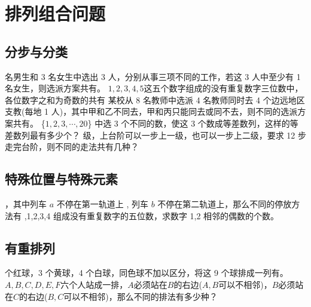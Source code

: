 \documentclass{article}
\begin{document}
\section{排列组合问题}
    \subsection{分步与分类}
         名男生和 3 名女生中选出 3 人，分别从事三项不同的工作，若这 3 人中至少有 1 名女生，则选派方案共有。
        $1,2,3,4,5$这五个数字组成的没有重复数字三位数中，各位数字之和为奇数的共有\lines
        \question[*]某校从 8 名教师中选派 4 名教师同时去 4 个边远地区支教(每地 1 人)，其中甲和乙不同去，甲和丙只能同去或同不去，则不同的选派方案共有。%
        \{$1 , 2 , 3 , \cdots, 20$\} 中选 3 个不同的数，使这 3 个数成等差数列，这样的等差数列最有多少个？
         级，上台阶可以一步上一级，也可以一步上二级，要求 12 步走完台阶，则不同的走法共有几种？
    \subsection{特殊位置与特殊元素}
        ，其中列车 $a$ 不停在第一轨道上 , 列车 $b$ 不停在第二轨道上，那么不同的停放方法有\lines
        ,1,2,3,4 组成没有重复数字的五位数，求数字 1,2 相邻的偶数的个数。%
    \subsection{有重排列}
         个红球，3 个黄球，4 个白球，同色球不加以区分，将这 9 个球排成一列有。
        \question$A,B,C,D,E,F$六个人站成一排，$A$必须站在$B$的右边($A,B$可以不相邻)，$B$必须站在$C$的右边($B,C$可以不相邻)，那么不同的排法有多少种？%
\end{document}
